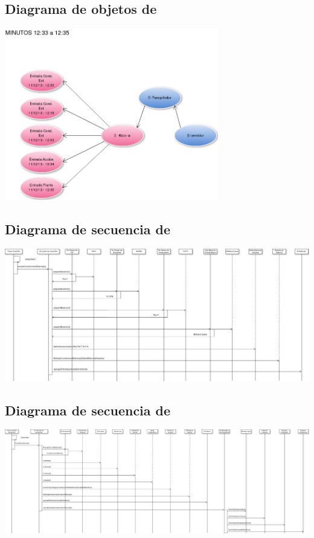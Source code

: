 \begin{landscape}
    \subsection{Diagrama de objetos de \historial{}}
        \includegraphics[width=0.7\textwidth]{img/objetosHistorial.png}
    \newpage

    \subsection{Diagrama de secuencia de \condiciones{}}
        \includegraphics[width=1.3\textwidth]{img/condicionesExternas.png}
    \newpage

    \subsection{Diagrama de secuencia de \decisiones{}}
        \includegraphics[width=1.4\textwidth]{img/decisiones.png}

\end{landscape}
